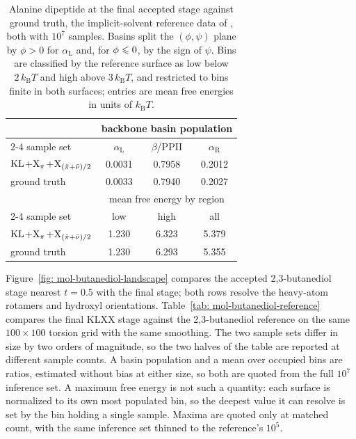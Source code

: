 \documentclass{article}
\begin{document}
\begin{table}[htb]
\centering
\small
\begin{tabular}{lccc}
\toprule
& \multicolumn{3}{c}{backbone basin population} \\
\cmidrule(l){2-4}
sample set & \(\alpha_{\mathrm L}\) & \(\beta\)/PPII & \(\alpha_{\mathrm R}\) \\
\midrule
$\mathrm{KL}$+$\mathrm{X}_\pi$+$\mathrm{X}_{(\hat\pi+\bar\nu)/2}$ & 0.0031 & 0.7958 & 0.2012 \\
ground truth & 0.0033 & 0.7940 & 0.2027 \\
\midrule
& \multicolumn{3}{c}{mean free energy by region} \\
\cmidrule(l){2-4}
sample set & low & high & all \\
\midrule
$\mathrm{KL}$+$\mathrm{X}_\pi$+$\mathrm{X}_{(\hat\pi+\bar\nu)/2}$ & 1.230 & 6.323 & 5.379 \\
ground truth & 1.230 & 6.293 & 5.355 \\
\bottomrule
\end{tabular}
\caption{Alanine dipeptide at the final accepted stage against ground truth, the implicit-solvent reference data of \citet{midgley2022flow}, both with \(10^7\) samples. Basins split the \((\phi,\psi)\) plane by \(\phi>0\) for \(\alpha_{\mathrm L}\) and, for \(\phi\leqslant0\), by the sign of \(\psi\). Bins are classified by the reference surface as low below \(2\,k_{\mathrm B}T\) and high above \(3\,k_{\mathrm B}T\), and restricted to bins finite in both surfaces; entries are mean free energies in units of \(k_{\mathrm B}T\).}
\label{tab: mol-adp-reference}
\end{table}

Figure~\ref{fig: mol-butanediol-landscape} compares the accepted 2,3-butanediol stage nearest \(t=0.5\) with the final stage; both rows resolve the heavy-atom rotamers and hydroxyl orientations.
Table~\ref{tab: mol-butanediol-reference} compares the final KLXX stage against the 2,3-butanediol reference on the same \(100\times100\) torsion grid with the same smoothing. The two sample sets differ in size by two orders of magnitude, so the two halves of the table are reported at different sample counts. A basin population and a mean over occupied bins are ratios, estimated without bias at either size, so both are quoted from the full \(10^7\) inference set. A maximum free energy is not such a quantity: each surface is normalized to its own most populated bin, so the deepest value it can resolve is set by the bin holding a single sample. Maxima are quoted only at matched count, with the same inference set thinned to the reference's \(10^5\).
\end{document}
